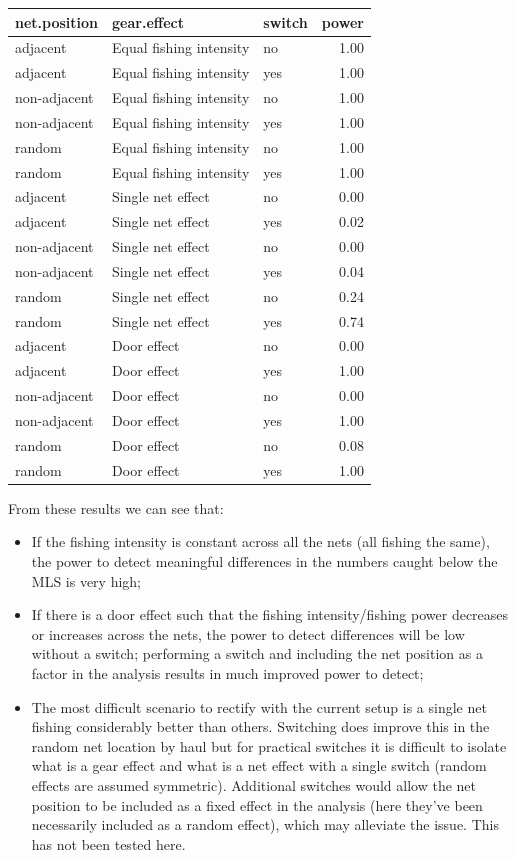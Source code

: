 \documentclass[12pt]{article}\usepackage[]{graphicx}\usepackage[]{color}
\begin{document}
\begin{table}[ht]
\centering
\begin{tabular}{lllr}
  \hline
net.position & gear.effect & switch & power \\ 
  \hline
adjacent & Equal fishing intensity & no & 1.00 \\ 
  adjacent & Equal fishing intensity & yes & 1.00 \\ 
  non-adjacent & Equal fishing intensity & no & 1.00 \\ 
  non-adjacent & Equal fishing intensity & yes & 1.00 \\ 
  random & Equal fishing intensity & no & 1.00 \\ 
  random & Equal fishing intensity & yes & 1.00 \\ 
  adjacent & Single net effect & no & 0.00 \\ 
  adjacent & Single net effect & yes & 0.02 \\ 
  non-adjacent & Single net effect & no & 0.00 \\ 
  non-adjacent & Single net effect & yes & 0.04 \\ 
  random & Single net effect & no & 0.24 \\ 
  random & Single net effect & yes & 0.74 \\ 
  adjacent & Door effect & no & 0.00 \\ 
  adjacent & Door effect & yes & 1.00 \\ 
  non-adjacent & Door effect & no & 0.00 \\ 
  non-adjacent & Door effect & yes & 1.00 \\ 
  random & Door effect & no & 0.08 \\ 
  random & Door effect & yes & 1.00 \\ 
   \hline
\end{tabular}
\end{table}

From these results we can see that:

\begin{itemize}
  \item If the fishing intensity is constant across all the nets (all fishing the same), the power to detect meaningful differences in the numbers caught below the MLS is very high;
  \item If there is a door effect such that the fishing intensity/fishing power decreases or increases across the nets, the power to detect differences will be low without a switch; performing a switch and including the net position as a factor in the analysis results in much improved power to detect;
  \item The most difficult scenario to rectify with the current setup is a single net fishing considerably better than others. Switching does improve this in the random net location by haul but for practical switches it is difficult to isolate what is a gear effect and what is a net effect with a single switch (random effects are assumed symmetric). Additional switches would allow the net position to be included as a fixed effect in the analysis (here they've been necessarily included as a random effect), which may alleviate the issue. This has not been tested here.
\end{itemize}



\end{document}
